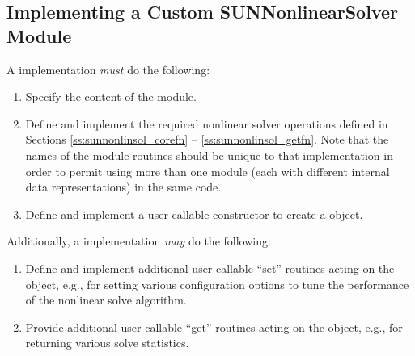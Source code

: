 \subsection{Implementing a Custom SUNNonlinearSolver Module}
\label{ss:sunnonlinsol_custom}

A {\sunnonlinsol} implementation \textit{must} do the following:
\begin{enumerate}
\item Specify the content of the {\sunnonlinsol} module.
\item Define and implement the required nonlinear solver operations
  defined in Sections \ref{ss:sunnonlinsol_corefn}
  -- \ref{ss:sunnonlinsol_getfn}. Note that the names of the module
  routines should be unique to that implementation in order to permit
  using more than one {\sunnonlinsol} module (each with different
   internal data representations) in
  the same code.
\item Define and implement a user-callable constructor to create a
   object.
\end{enumerate}
Additionally, a  implementation \textit{may} do
the following:
\begin{enumerate}
\item Define and implement additional user-callable ``set''
  routines acting on the  object, e.g., for
  setting various configuration options to tune the performance of
  the nonlinear solve algorithm.
\item Provide additional user-callable ``get'' routines acting on the
   object, e.g., for returning various solve
  statistics.
\end{enumerate}

